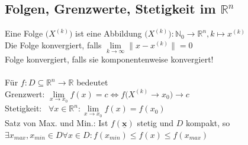 \documentclass[6pt,a4paper]{scrartcl}
\newcommand{\norm}[1]{\ensuremath{\|#1\|}}														%
\renewcommand{\vec}[1]{\ensuremath{\underline{\boldsymbol {#1}}}}								%
\begin{document}
\begin{multicols}{4}
\subsection{Folgen, Grenzwerte, Stetigkeit im $\mathbb R^n$}
Eine Folge $\bigl( X^{(k)} \bigr)$ ist eine Abbildung $\bigl(X^{(k)}\bigr):\mathbb N_0 \rightarrow \mathbb R^n, k\mapsto x^{(k)}$\\
Die Folge konvergiert, falls $\lim\limits_{k \rightarrow \infty} \norm{x-x^{(k)}} = 0$\\
Folge konvergiert, falls sie komponentenweise konvergiert!\\
\\
Für $f:D \subseteq \mathbb R^n \rightarrow \mathbb R$ bedeutet \\
Grenzwert: \quad  $\lim\limits_{x \rightarrow x_0} f(x) =c \Leftrightarrow f \bigl(X^{(k)} \rightarrow x_0 \bigr) \rightarrow c$\\
Stetigkeit: \quad \ $\forall x \in \mathbb R^n:\lim\limits_{x \rightarrow x_0} f(x) = f(x_0)$\\
Satz von Max. und Min.: Ist $f(\vec x)$ stetig und $D$ kompakt, so\\
$\exists x_{max},x_{min} \in D \forall x\in D:f(x_{min}) \le f(x) \le f(x_{max})$






\end{multicols}
\end{document}
